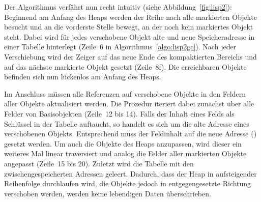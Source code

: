 Der Algorithmus verfährt nun recht intuitiv (siehe Abbildung~\ref{fig:lisp2}):
Beginnend am Anfang des Heaps werden der Reihe nach alle markierten Objekte besucht und an die vorderste Stelle bewegt, an der noch kein markiertes Objekt steht.
Dabei wird für jedes verschobene Objekt alte und neue Speicheradresse in einer Tabelle  hinterlegt (Zeile~6 in Algorithmus~\ref{algo:lisp2gc}).
Nach jeder Verschiebung wird der Zeiger  auf das neue Ende des kompaktierten Bereichs und  auf das nächste markierte Objekt gesetzt (Zeile~8f).
Die erreichbaren Objekte befinden sich nun lückenlos am Anfang des Heaps.

Im Anschluss müssen alle Referenzen auf verschobene Objekte in den Feldern aller Objekte aktualisiert werden.
Die Prozedur  iteriert dabei zunächst über alle Felder von Basisobjekten (Zeile~12 bis 14).
Falls der Inhalt  eines Felds als Schlüssel in der Tabelle auftaucht, so handelt es sich um die alte Adresse eines verschobenen Objekts.
Entsprechend muss der Feldinhalt auf die neue Adresse () gesetzt werden.
Um auch die Objekte des Heaps anzupassen, wird dieser ein weiteres Mal linear traversiert und analog die Felder aller markierten Objekte angepasst (Zeile~15 bis 20).
Zuletzt wird die Tabelle mit den zwischengespeicherten Adressen geleert.
Dadurch, dass der Heap in aufsteigender Reihenfolge durchlaufen wird, die Objekte jedoch in entgegengesetzte Richtung verschoben werden, werden keine lebendigen Daten überschrieben.

